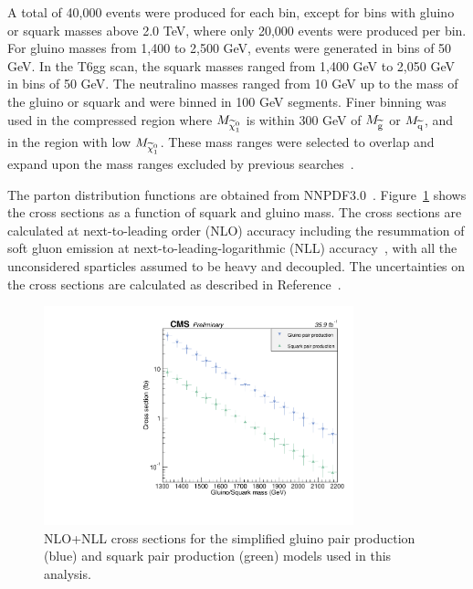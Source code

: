 A total of 40,000 events were produced for
each bin, except for bins with gluino or squark masses above 2.0 TeV, where only
20,000 events were produced per bin.
For gluino masses from 1,400 to 2,500 GeV, events were generated
in bins of 50 GeV.  In the T6gg scan, the squark masses ranged from
1,400 GeV to 2,050 GeV in bins of 50 GeV.
The neutralino masses ranged from 10 GeV up to the mass
of the gluino or squark and were binned in
100 GeV segments. Finer binning was used in the compressed region where
$M_{\widetilde{\chi}^{0}_{1}}$ is within 300 GeV of $M_{\widetilde{\mathrm{g}}}$ or $M_{\widetilde{\mathrm{q}}}$,
and in the region with low $M_{\widetilde{\chi}^{0}_{1}}$.
These mass ranges were selected to overlap and
expand upon the mass ranges excluded by previous
searches~\cite{ATLAS:2016aa,CMS:2015_anal}.

The parton distribution
functions are obtained from NNPDF3.0~\cite{Ball:2014uwa}.
Figure~\ref{fig:xSec} shows the cross sections as a function
of squark and gluino mass.
The cross sections are calculated at next-to-leading order 
(NLO) accuracy including the resummation of soft gluon emission
at next-to-leading-logarithmic (NLL) accuracy~\cite{Kulesza:2009kq, Beenakker:2009ha},
with all the unconsidered sparticles assumed to be heavy and decoupled.
The uncertainties on the cross sections are calculated as
described in Reference~\cite{Borschensky:2014cia}.


\begin{figure}[htbp]
    \centering
    \includegraphics[width=0.8\textwidth]{Figures/Results/xSecPlot.pdf}
    \caption{NLO+NLL cross sections for the simplified gluino pair production (blue)
    and squark pair production (green) models used in this analysis.}
    \label{fig:xSec}
\end{figure}


